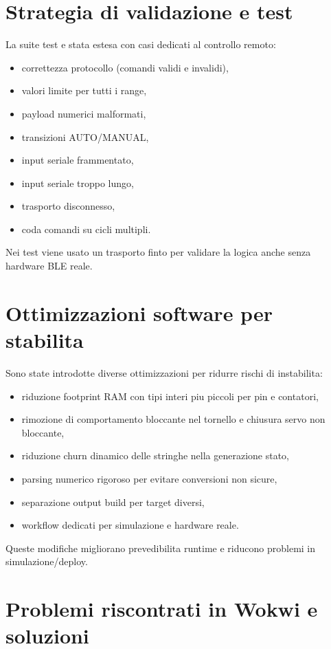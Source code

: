 \section{Strategia di validazione e test}
La suite test e stata estesa con casi dedicati al controllo remoto:

\begin{itemize}
  \item correttezza protocollo (comandi validi e invalidi),
  \item valori limite per tutti i range,
  \item payload numerici malformati,
  \item transizioni AUTO/MANUAL,
  \item input seriale frammentato,
  \item input seriale troppo lungo,
  \item trasporto disconnesso,
  \item coda comandi su cicli multipli.
\end{itemize}

Nei test viene usato un trasporto finto per validare la logica anche senza hardware BLE reale.

\section{Ottimizzazioni software per stabilita}
Sono state introdotte diverse ottimizzazioni per ridurre rischi di instabilita:

\begin{itemize}
  \item riduzione footprint RAM con tipi interi piu piccoli per pin e contatori,
  \item rimozione di comportamento bloccante nel tornello e chiusura servo non bloccante,
  \item riduzione churn dinamico delle stringhe nella generazione stato,
  \item parsing numerico rigoroso per evitare conversioni non sicure,
  \item separazione output build per target diversi,
  \item workflow dedicati per simulazione e hardware reale.
\end{itemize}

Queste modifiche migliorano prevedibilita runtime e riducono problemi in simulazione/deploy.

\section{Problemi riscontrati in Wokwi e soluzioni}

